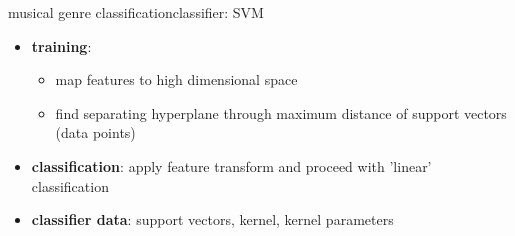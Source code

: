         \begin{frame}{musical genre classification}{classifier: SVM}
            \begin{itemize}
                \item	\textbf{training}:
                    \begin{itemize}
                        \item   map features to high dimensional space
                        \item   find separating hyperplane through maximum distance of support vectors (data points)
                    \end{itemize}
                \item<2->	\textbf{classification}: apply feature transform and proceed with 'linear' classification
                \item<3->	\textbf{classifier data}: support vectors, kernel, kernel parameters
            \end{itemize}
        \end{frame}
    
